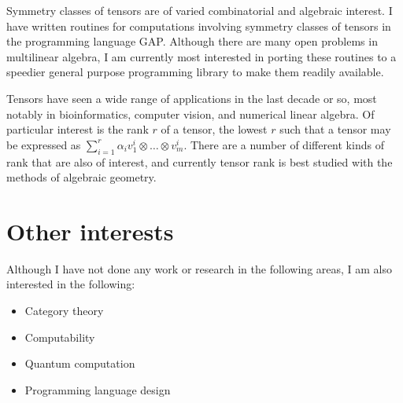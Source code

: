 \documentclass[11pt]{article}
\begin{document}
Symmetry classes of tensors are of varied combinatorial and algebraic
interest. I have written routines for computations involving symmetry classes of
tensors in the programming language GAP. Although there are many open problems
in multilinear algebra, I am currently most interested in porting these routines
to a speedier general purpose programming library to make them readily
available.

Tensors have seen a wide range of applications in the last decade or so, most
notably in bioinformatics, computer vision, and numerical linear algebra. Of
particular interest is the rank $r$ of a tensor, the lowest $r$ such that a
tensor may be expressed as \( \sum_{i=1}^r\alpha_i v_1^i \otimes \dots \otimes
v_m^i \). There are a number of different kinds of rank that are also of
interest, and currently tensor rank is best studied with the methods of
algebraic geometry.

\section{Other interests}

Although I have not done any work or research in the following areas, I am also
interested in the following:

\begin{itemize}
\item Category theory
\item Computability
\item Quantum computation
\item Programming language design
\end{itemize}
\end{document}

